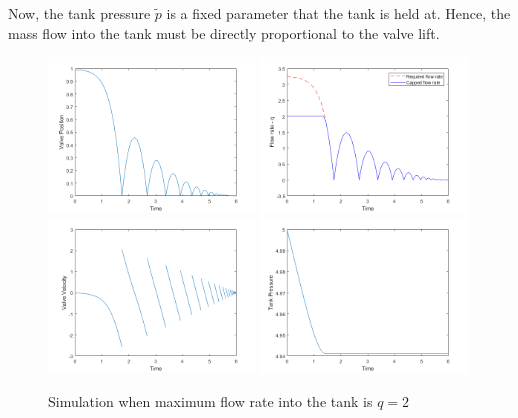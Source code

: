 Now, the tank pressure $\tilde{p}$ is a fixed parameter that the tank is held at. Hence, the mass flow into the tank must be directly proportional to the valve lift.
~
% 
\begin{figure}[!ht]
    \centering
    \includegraphics[width=0.49\textwidth]{Figures/FixedPressure/Position.png}
    \includegraphics[width=0.49\textwidth]{Figures/FixedPressure/FlowRate.png}
    \includegraphics[width=0.49\textwidth]{Figures/FixedPressure/Velocity.png}
    \includegraphics[width=0.49\textwidth]{Figures/FixedPressure/Pressure.png}
    \caption{Simulation when maximum flow rate into the tank is $q = 2$}
    \label{fig: FixPres}
\end{figure}

